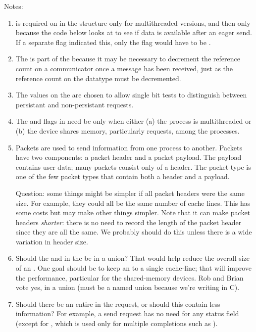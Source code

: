 Notes:
\begin{enumerate}
\item {} is required on  in the 
  structure only for multithreaded versions, and then only because the code
  below looks at  to see if data is available after an eager send.
  If a separate flag indicated this, only the flag would have to be
  . 

\item The  is part of the  because it may
  be necessary to decrement the reference count on a communicator once a
  message has been received, just as the reference count on the datatype must
  be decremented.  

\item The values on the  are chosen to allow single
  bit tests to distinguish between persistant and non-persistant requests.

\item The  and  flags in 
  need be 
   only when either (a) the process is multithreaded or (b) the
  device shares memory, particularly requests, among the processes.

\item Packets are used to send information from one process to another.
  Packets have two components: a packet header and a packet payload.  The
  payload contains user data; many packets consist only of a header. 
  The packet type  is one of the few packet types that
  contain both a header and a payload. 

  Question: some things might be simpler if all packet headers were the same
  size.  For example, they could all be the same number of cache lines.
  This has some costs but may make other things simpler.  Note that it can
  make packet headers \emph{shorter}: there is no need to record the length of
  the packet header since they are all the same.  We probably should do this
  unless there is a wide variation in header size.

\item Should the  and  in
  the  be in a
  union?  That would help reduce the overall size of an .
  One goal should be to keep an  to a single cache-line;
  that will improve the performance, particular for the shared-memory
  devices.
  Rob and Brian vote yes, in a union (must be a named union because we're
  writing in C).

\item Should there be an entire  in the request, or should
  this contain less information?  For example, a send request has no need for
  any status field (except for , which is used only for
  multiple completions such as ).  
\end{enumerate}

